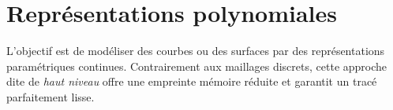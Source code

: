 


\section{Représentations polynomiales}

L'objectif est de modéliser des courbes ou des surfaces par des représentations paramétriques continues. Contrairement aux maillages discrets, cette approche dite de \emph{haut niveau} offre une empreinte mémoire réduite et garantit un tracé parfaitement lisse.


